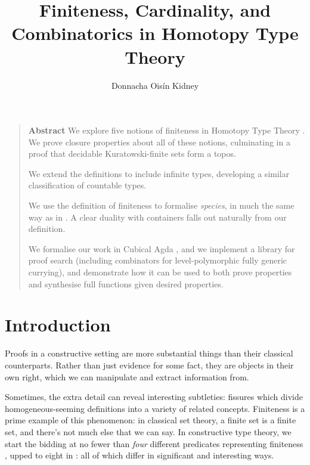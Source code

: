 
\title{Finiteness, Cardinality, and Combinatorics in Homotopy Type Theory}
\author{Donnacha Oisín Kidney}

\maketitle
\listoftodos
\tableofcontents
\newcommand{\pifun}[2]{\prod_{\left( \mathit{ #1 } : #2 \right)}}
\begin{quote}
  \textbf{Abstract}
  We explore five notions of finiteness in Homotopy Type Theory \cite{hottbook}.
  We prove closure properties about all of these notions, culminating in a proof
  that decidable Kuratowski-finite sets form a topos.

  We extend the definitions to include infinite types, developing a similar
  classification of countable types.

  We use the definition of finiteness to formalise \emph{species}, in much
  the same way as in \cite{yorgeyCombinatorialSpeciesLabelled2014}.
  A clear duality with containers
  \cite{abbottContainersConstructingStrictly2005} falls out naturally from our
  definition.

  We formalise our work in Cubical Agda
  \cite{vezzosiCubicalAgdaDependently2019}, and we implement a library for proof
  search (including combinators for level-polymorphic fully generic currying),
  and demonstrate how it can be used to both prove properties and synthesise
  full functions given desired properties.
\end{quote}
\section{Introduction}
Proofs in a constructive setting are more substantial things than their
classical counterparts.
Rather than just evidence for some fact, they are objects in their own right,
which we can manipulate and extract information from.

Sometimes, the extra detail can reveal interesting subtleties: fissures which
divide homogeneous-seeming definitions into a variety of related concepts.
Finiteness is a prime example of this phenomenon: in classical set theory, a
finite set is a finite set, and there's not much else that we can say.
In constructive type theory, we start the bidding at no fewer than \emph{four}
different predicates representing finiteness
\cite{spiwackConstructivelyFinite2010}, upped to eight in
\cite{firsovVariationsNoetherianness2016a}: all of which differ in significant
and interesting ways.

